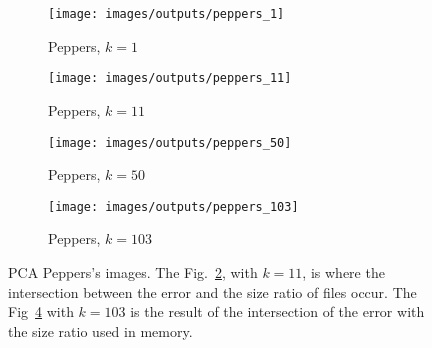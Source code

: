 \documentclass[journal]{IEEEtran}
\begin{document}
\begin{figure}
	\centering
	\begin{subfigure}{0.23\textwidth}
		\centering
		\texttt{[image: images/outputs/peppers\_1]} 
		\caption{Peppers, $k=1$}
		\label{fig:outputs:peppers_1} 
	\end{subfigure}
	\centering
	\begin{subfigure}{0.23\textwidth}
		\centering
		\texttt{[image: images/outputs/peppers\_11]} 
		\caption{Peppers, $k=11$}
		\label{fig:outputs:peppers_11} 
	\end{subfigure}
	
	\centering
	\begin{subfigure}{0.23\textwidth}
		\centering
		\texttt{[image: images/outputs/peppers\_50]} 
		\caption{Peppers, $k=50$}
		\label{fig:outputs:peppers_50} 
	\end{subfigure}
	\centering
	\begin{subfigure}{0.23\textwidth}
		\centering
		\texttt{[image: images/outputs/peppers\_103]} 
		\caption{Peppers, $k=103$}
		\label{fig:outputs:peppers_103} 
	\end{subfigure}
	
	
	\caption{PCA Peppers's images. The Fig.~\ref{fig:outputs:peppers_11}, with $k=11$, is where the intersection between the error and the size ratio of files occur. The Fig~\ref{fig:outputs:peppers_103} with $k=103$ is the result of the intersection of the error with the size ratio used in memory.}
	\label{fig:outputs:peppers}
\end{figure}
\end{document}
